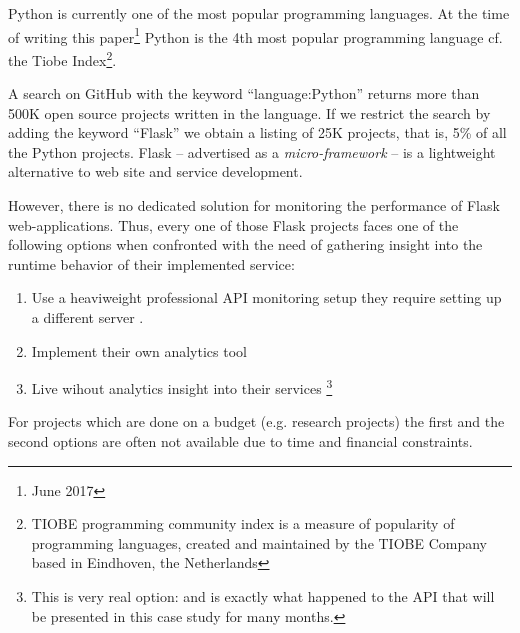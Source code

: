 \documentclass[conference]{IEEEtran}
\begin{document}

Python is currently one of the most popular programming languages. At the time of writing this paper\footnote{June 2017} Python is the 4th most popular programming language cf. the Tiobe Index\footnote{TIOBE programming community index is a measure of popularity of programming languages, created and maintained by the TIOBE Company based in Eindhoven, the Netherlands}. 


A search on GitHub with the keyword ``language:Python'' returns more than 500K open source projects written in the language. If we restrict the search by adding the keyword ``Flask'' we obtain a listing of 25K projects, that is, 5\% of all the Python projects. Flask -- advertised as a {\em micro-framework} -- is a lightweight alternative to web site and service development. 


However, there is no dedicated solution for monitoring the performance of Flask web-applications. Thus, every one of those Flask projects faces one of the following options when confronted with the need of gathering insight into the runtime behavior of their implemented service: 

  \begin{enumerate}

    \item Use a heaviweight professional API monitoring setup they require setting up a different server . 

    \item Implement their own analytics tool 

    \item Live wihout analytics insight into their services \footnote{This is very real option: and is exactly what happened to the API that will be presented in this case study for many months. }

  \end{enumerate}


For projects which are done on a budget (e.g. research projects) the first and the second options are often not available due to time and financial constraints. 
\end{document}

